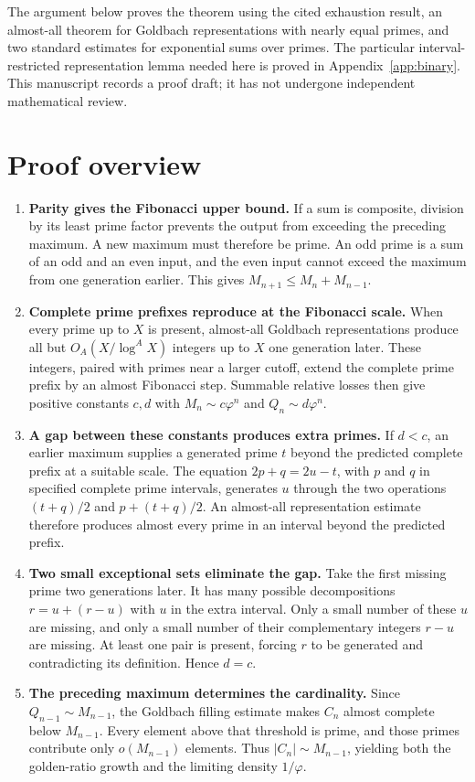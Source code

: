 \documentclass[11pt,letterpaper]{article}
\numberwithin{equation}{section}
\theoremstyle{remark}
\newcommand{\ph}{\varphi}
\begin{document}
The argument below proves the theorem using the cited exhaustion result,
an almost-all theorem for Goldbach representations with nearly equal primes,
and two standard estimates for exponential sums over primes. The particular
interval-restricted representation lemma needed here is proved in
Appendix~\ref{app:binary}. This manuscript records a proof draft; it has not
undergone independent mathematical review.

\section{Proof overview}

\begin{enumerate}
\item \textbf{Parity gives the Fibonacci upper bound.}
If a sum is composite, division by its least prime factor prevents the
output from exceeding the preceding maximum. A new maximum must therefore
be prime. An odd prime is a sum of an odd and an even input, and the even
input cannot exceed the maximum from one generation earlier. This gives
$M_{n+1}\le M_n+M_{n-1}$.

\item \textbf{Complete prime prefixes reproduce at the Fibonacci scale.}
When every prime up to $X$ is present, almost-all Goldbach representations
produce all but $O_A(X/\log^A X)$ integers up to $X$ one generation later.
These integers, paired with primes near a larger cutoff, extend the complete
prime prefix by an almost Fibonacci step. Summable relative losses then give
positive constants $c,d$ with $M_n\sim c\ph^n$ and $Q_n\sim d\ph^n$.

\item \textbf{A gap between these constants produces extra primes.}
If $d<c$, an earlier maximum supplies a generated prime $t$ beyond the
predicted complete prefix at a suitable scale. The equation
$2p+q=2u-t$, with $p$ and $q$ in specified complete prime intervals,
generates $u$ through the two operations
$(t+q)/2$ and $p+(t+q)/2$. An almost-all representation estimate therefore
produces almost every prime in an interval beyond the predicted prefix.

\item \textbf{Two small exceptional sets eliminate the gap.}
Take the first missing prime two generations later. It has many possible
decompositions $r=u+(r-u)$ with $u$ in the extra interval. Only a small
number of these $u$ are missing, and only a small number of their complementary
integers $r-u$ are missing. At least one pair is present, forcing $r$ to be
generated and contradicting its definition. Hence $d=c$.

\item \textbf{The preceding maximum determines the cardinality.}
Since $Q_{n-1}\sim M_{n-1}$, the Goldbach filling estimate makes
$C_n$ almost complete below $M_{n-1}$. Every element above that threshold
is prime, and those primes contribute only $o(M_{n-1})$ elements.
Thus $|C_n|\sim M_{n-1}$, yielding both the golden-ratio growth and
the limiting density $1/\ph$.
\end{enumerate}
\end{document}
